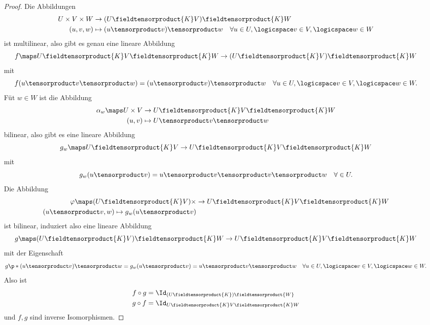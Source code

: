 \begin{proof}
  Die Abbildungen
  \begin{align*}
    U\times V\times W&\to (U\fieldtensorproduct{K}V)\fieldtensorproduct{K}W\\
    (u,v,w)&\mapsto (u\tensorproduct v)\tensorproduct w\quad \forall u\in U,\logicspace v\in V,\logicspace w\in W
  \end{align*}
  ist multilinear, also gibt es genau eine lineare Abbildung
  \begin{equation*}
    f\maps U\fieldtensorproduct{K} V\fieldtensorproduct{K} W\to (U\fieldtensorproduct{K}V)\fieldtensorproduct{K}W
  \end{equation*}
  mit 
  \begin{equation*}
    f(u\tensorproduct v\tensorproduct w)=(u\tensorproduct v)\tensorproduct w\quad \forall u\in U,\logicspace v\in V,\logicspace w\in W.
  \end{equation*}
  Füt \( w\in W \) ist die Abbildung
  \begin{align*}
    \alpha_w\maps U\times V&\to U\fieldtensorproduct{K}V\fieldtensorproduct{K}W\\
    (u,v)&\mapsto U\tensorproduct v\tensorproduct w
  \end{align*}
  bilinear, also gibt es eine lineare Abbildung
  \begin{equation*}
    g_w\maps U\fieldtensorproduct{K}V\to U\fieldtensorproduct{K}V\fieldtensorproduct{K}W
  \end{equation*}
  mit
  \begin{equation*}
    g_w(u\tensorproduct v)=u\tensorproduct v \tensorproduct v \tensorproduct w\quad \forall \in U.
  \end{equation*}
  Die Abbildung
  \begin{align*}
    \varphi\maps (U\fieldtensorproduct{K}V)\times &\to U\fieldtensorproduct{K}V\fieldtensorproduct{K}W\\
    (u\tensorproduct v,w)\mapsto g_w(u\tensorproduct v)
  \end{align*}
  ist bilinear, induziert also eine lineare Abbildung
  \begin{equation*}
    g\maps (U\fieldtensorproduct{K} V)\fieldtensorproduct{K} W\to U\fieldtensorproduct{K} V \fieldtensorproduct{K} W
  \end{equation*}
  mit der Eigenschaft
  \begin{equation*}
    g\p*{(u\tensorproduct v)\tensorproduct w}=g_w(u\tensorproduct v)=u\tensorproduct v\tensorproduct w\quad \forall u\in U,\logicspace v\in V,\logicspace w\in W.
  \end{equation*}
  Also ist
  \begin{align*}
    f\circ g&=\Id_{(U\fieldtensorproduct{K})\fieldtensorproduct{W}}\\
    g\circ f&=\Id_{U\fieldtensorproduct{K}V\fieldtensorproduct{K}W}
  \end{align*}
  und \( f,g \) sind inverse Isomorphismen.
  
\end{proof}
